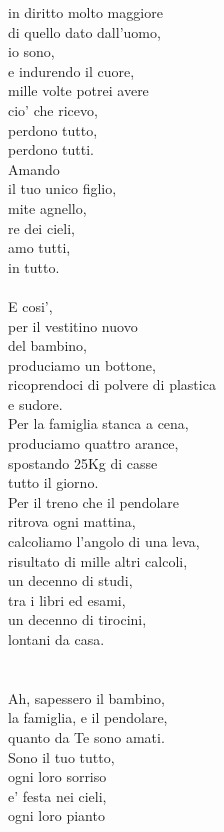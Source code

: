 \begin{haiku}
in diritto molto maggiore\\
di quello dato dall'uomo,\\
io sono,\\
e indurendo il cuore,\\
mille volte potrei avere\\
cio' che ricevo,\\
perdono tutto,\\
perdono tutti.\\
Amando \\
il tuo unico figlio,\\
mite agnello,\\
re dei cieli,\\
amo tutti,\\
in tutto.\\
\leavevmode\\
E cosi',\\
per il vestitino nuovo\\
del bambino,\\
produciamo un bottone,\\
ricoprendoci di polvere di plastica\\
e sudore.\\
Per la famiglia stanca a cena,\\
produciamo quattro arance,\\
spostando 25Kg di casse\\
tutto il giorno.\\
Per il treno che il pendolare \\
ritrova ogni mattina,\\
calcoliamo l'angolo di una leva,\\
risultato di mille altri calcoli,\\
un decenno di studi, \\
tra i libri ed esami,\\
un decenno di tirocini,\\
lontani da casa.\\
\leavevmode\\
\leavevmode\\
Ah, sapessero il bambino,\\
la famiglia, e il pendolare,\\
quanto da Te sono amati.\\
Sono il tuo tutto,\\
ogni loro sorriso\\
e' festa nei cieli,\\
ogni loro pianto\\

\end{haiku}

